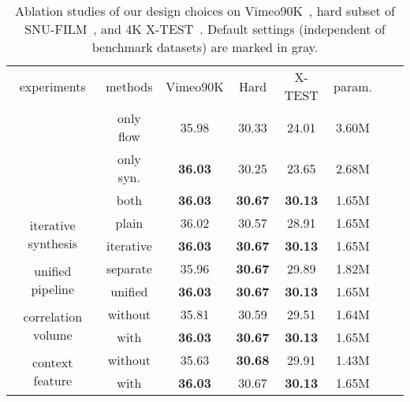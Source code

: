 \documentclass[10pt,twocolumn,letterpaper]{article}
\begin{document}
\begin{table}[tb]
\centering
\small
\setlength{\tabcolsep}{0pt}
\begin{tabular*}{0.48\textwidth}{@{\extracolsep{\fill}}*{8}{c}}
\hline
experiments & methods & Vimeo90K & Hard & X-TEST & param.\\
\Xhline{2\arrayrulewidth}
\multirow{3}{*}{recurrent modules}
            & only flow & 35.98 & 30.33 & 24.01 & 3.60M \\
                              & only syn. & \textbf{36.03} & 30.25 & 23.65
                              & 2.68M\\
                             & \cellcolor{gray!40}both & \textbf{36.03}
                             & \textbf{30.67} & \textbf{30.13} & 1.65M\\
\hline
\multirow{2}{*}{iterative synthesis}
                             & plain & 36.02 & 30.57 & 28.91 & 1.65M \\
                             & \cellcolor{gray!40}iterative  & \textbf{36.03}
                             & \textbf{30.67} & \textbf{30.13} & 1.65M\\
\hline
\multirow{2}{*}{unified pipeline}
                             & separate & 35.96 & \textbf{30.67} & 29.89 & 1.82M\\
                             & \cellcolor{gray!40}unified & \textbf{36.03}
                             & \textbf{30.67} & \textbf{30.13} & 1.65M\\
\hline



\multirow{2}{*}{correlation volume}  
                               & without & 35.81 & 30.59 & 29.51 & 1.64M \\
                             & \cellcolor{gray!40}with & \textbf{36.03} & \textbf{30.67}
                             & \textbf{30.13} & 1.65M\\
\hline
\multirow{2}{*}{context feature}  
                             & without & 35.63 & \textbf{30.68} & 29.91 & 1.43M\\
                              & \cellcolor{gray!40}with & \textbf{36.03} & 30.67
                              & \textbf{30.13} & 1.65M \\
\hline
\end{tabular*}
\caption{Ablation studies of our design choices on Vimeo90K~\cite{xue2019video},
hard subset of SNU-FILM~\cite{choi2020channel}, and 4K
X-TEST~\cite{sim2021xvfi}. Default settings (independent of benchmark datasets)
are marked in \colorbox{gray!40}{gray}.
}
\label{tab:ablation}
\end{table}
\end{document}
